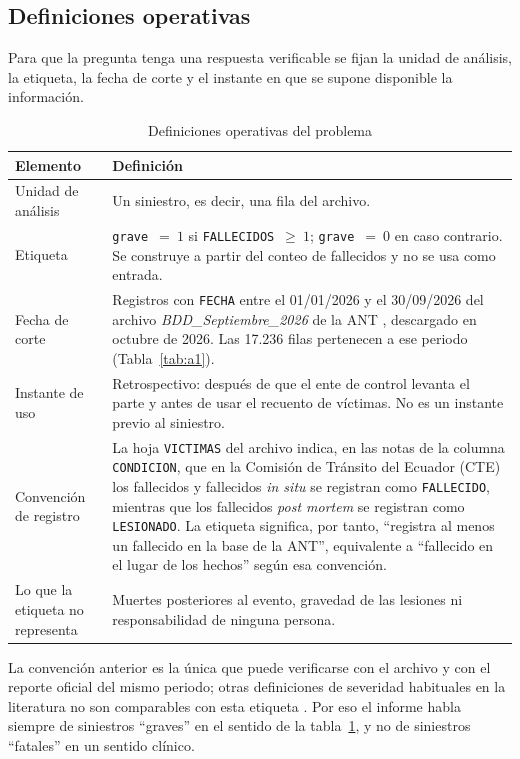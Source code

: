 \subsection{Definiciones operativas}

Para que la pregunta tenga una respuesta verificable se fijan la unidad de análisis, la etiqueta, la fecha de corte y el instante en que se supone disponible la información.

\begin{table}[htbp]
\centering
\small
\caption{Definiciones operativas del problema}
\label{tab:definiciones}
\begin{tabularx}{\textwidth}{lX}
\toprule
Elemento & Definición \\
\midrule
Unidad de análisis & Un siniestro, es decir, una fila del archivo. \\
Etiqueta & \texttt{grave}~$=~1$ si \texttt{FALLECIDOS}~$\geq~1$; \texttt{grave}~$=~0$ en caso contrario. Se construye a partir del conteo de fallecidos y no se usa como entrada. \\
Fecha de corte & Registros con \texttt{FECHA} entre el 01/01/2026 y el 30/09/2026 del archivo \emph{BDD\_Septiembre\_2026} de la ANT \cite{ref2}, descargado en octubre de 2026. Las 17.236 filas pertenecen a ese periodo (Tabla~\ref{tab:a1}). \\
Instante de uso & Retrospectivo: después de que el ente de control levanta el parte y antes de usar el recuento de víctimas. No es un instante previo al siniestro. \\
Convención de registro & La hoja \texttt{VICTIMAS} del archivo \cite{ref2} indica, en las notas de la columna \texttt{CONDICION}, que en la Comisión de Tránsito del Ecuador (CTE) los fallecidos y fallecidos \emph{in situ} se registran como \texttt{FALLECIDO}, mientras que los fallecidos \emph{post mortem} se registran como \texttt{LESIONADO}. La etiqueta significa, por tanto, ``registra al menos un fallecido en la base de la ANT'', equivalente a ``fallecido en el lugar de los hechos'' según esa convención. \\
Lo que la etiqueta no representa & Muertes posteriores al evento, gravedad de las lesiones ni responsabilidad de ninguna persona. \\
\bottomrule
\end{tabularx}
\end{table}

La convención anterior es la única que puede verificarse con el archivo y con el reporte oficial del mismo periodo; otras definiciones de severidad habituales en la literatura no son comparables con esta etiqueta \cite{ref8}. Por eso el informe habla siempre de siniestros ``graves'' en el sentido de la tabla~\ref{tab:definiciones}, y no de siniestros ``fatales'' en un sentido clínico.

